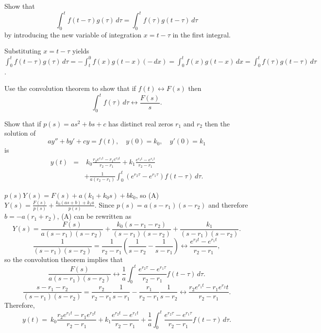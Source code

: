 \documentclass{ximera}
\begin{document}
\begin{problem}\label{exer:8.6.6}
 Show that
$$
\int_0^tf(t-\tau)g(\tau)\,d\tau=\int_0^tf(\tau)g(t-\tau)\,d\tau
$$
by introducing the new variable of integration $x=t-\tau$ in the first
integral.

\begin{solution}
Substituting $x=t-\tau$ yields
$\int_0^tf(t-\tau)g(\tau)\,d\tau=-\int_t^0f(x)g(t-x)(-\,dx)=
\int_0^tf(x)g(t-x)\,dx=\int_0^tf(\tau)g(t-\tau)\,d\tau$.
\end{solution}
\end{problem}

\begin{problem}\label{exer:8.6.7} Use the convolution theorem to show that if
$f(t)\leftrightarrow F(s)$ then
$$
\int_0^tf(\tau)\,d\tau\leftrightarrow \frac{F(s)}{s}.
$$
\end{problem}

\begin{problem}\label{exer:8.6.8}
 Show that if $p(s)=as^2+bs+c$ has
distinct real zeros $r_1$ and $r_2$ then the solution of
$$
ay''+by'+cy=f(t),\quad y(0)=k_0,\quad y'(0)=k_1
$$
is
\begin{eqnarray*}
y(t)&=&\; k_0\frac{r_2e^{r_1t}-r_1e^{r_2t}}{r_2-r_1}+k_1\frac{e^{r_2t}-e^{r_1t}
}{r_2-r_1}
\\
&&+\frac{1}{a(r_2-r_1)}\int_0^t(e^{r_2\tau}-e^{r_1\tau})f(t-\tau)\,d\tau.
\end{eqnarray*}

\begin{solution}
$p(s)Y(s)=F(s)+a(k_1+k_0s)+bk_0$, so
(A) $Y(s)=\frac{F(s)}{p(s)}+\frac{k_0(as+b)+k_1a}{p(s)}$.
Since $p(s)=a(s-r_1)(s-r_2)$ and therefore $b=-a(r_1+r_2)$,
(A) can be rewritten as
$$
Y(s)=\frac{F(s)}{a(s-r_1)(s-r_2)}+\frac{k_0(s-r_1-r_2)}{(s-r_1)(s-r_2)}
+\frac{k_1}{(s-r_1)(s-r_2)}.
$$
$$
\frac{1}{(s-r_1)(s-r_2)}=\frac{1}{r_2-r_1}\left(\frac{1}{s-r_2}
-\frac{1}{s-r_1}\right)\leftrightarrow\frac{e^{r_2t}-e^{r_1t}}{r_2-r_1},
$$
so the convolution theorem implies that
$$
\frac{F(s)}{a(s-r_1)(s-r_2)}\leftrightarrow
\frac{1}{a}\int_0^t\frac{e^{r_2\tau}-e^{r_1\tau}}{r_2-r_1}f(t-\tau)\,d\tau.
$$
$$
\frac{s-r_1-r_2}{(s-r_1)(s-r_2)}=\frac{r_2}{r_2-r_1}\frac{1}{s-r_1}
-\frac{r_1}{r_2-r_1}\frac{1}{s-r_2}\leftrightarrow
\frac{r_2e^{r_1t}-r_1e^{r_2}t}{r_2-r_1}.
$$
Therefore,
$$
y(t)=\ k_0\frac{r_2e^{r_1t}-r_1e^{r_2t}}{r_2-r_1}+k_1\frac{e^{r_2t}-e^{r_1t}}{r_2-r_1}
+\frac{1}{a}
\int_0^t\frac{e^{r_2\tau}-e^{r_1\tau}}{r_2-r_1}f(t-\tau)\,d\tau.
$$
\end{solution}
\end{problem}
\end{document}
